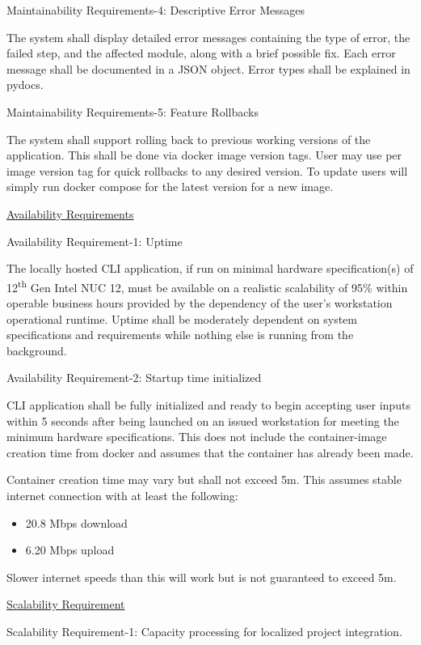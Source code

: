 Maintainability Requirements-4: Descriptive Error Messages

The system shall display detailed error messages containing the type of
error, the failed step, and the affected module, along with a brief
possible fix. Each error message shall be documented in a JSON object.
Error types shall be explained in pydocs.

Maintainability Requirements-5: Feature Rollbacks

The system shall support rolling back to previous working versions of
the application. This shall be done via docker image version tags. User
may use per image version tag for quick rollbacks to any desired
version. To update users will simply run docker compose for the latest
version for a new image.

\ul{Availability Requirements}

Availability Requirement-1: Uptime

The locally hosted CLI application, if run on minimal hardware
specification(s) of 12\textsuperscript{th} Gen Intel NUC 12, must be
available on a realistic scalability of 95\% within operable business
hours provided by the dependency of the user's workstation operational
runtime. Uptime shall be moderately dependent on system specifications
and requirements while nothing else is running from the background.

Availability Requirement-2: Startup time initialized

CLI application shall be fully initialized and ready to begin accepting
user inputs within 5 seconds after being launched on an issued
workstation for meeting the minimum hardware specifications. This does
not include the container-image creation time from docker and assumes
that the container has already been made.

Container creation time may vary but shall not exceed 5m. This assumes
stable internet connection with at least the following:

\begin{itemize}
\item
  20.8 Mbps download
\item
  6.20 Mbps upload
\end{itemize}

Slower internet speeds than this will work but is not guaranteed to
exceed 5m.

\ul{Scalability Requirement}

Scalability Requirement-1: Capacity processing for localized project
integration.


